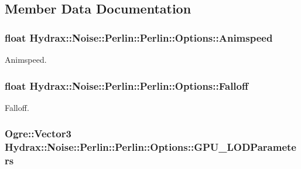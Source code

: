 \subsection{Member Data Documentation}
\hypertarget{struct_hydrax_1_1_noise_1_1_perlin_1_1_options_77f9a42f5ebbe148f0c4610f3fe818cd}{
\subsubsection[{Animspeed}]{\setlength{\rightskip}{0pt plus 5cm}float Hydrax::Noise::Perlin::Perlin::Options::Animspeed}}
\label{struct_hydrax_1_1_noise_1_1_perlin_1_1_options_77f9a42f5ebbe148f0c4610f3fe818cd}


Animspeed. 

\hypertarget{struct_hydrax_1_1_noise_1_1_perlin_1_1_options_8fdaf68802a6abfa74665e8fd31a54aa}{
\subsubsection[{Falloff}]{\setlength{\rightskip}{0pt plus 5cm}float Hydrax::Noise::Perlin::Perlin::Options::Falloff}}
\label{struct_hydrax_1_1_noise_1_1_perlin_1_1_options_8fdaf68802a6abfa74665e8fd31a54aa}


Falloff. 

\hypertarget{struct_hydrax_1_1_noise_1_1_perlin_1_1_options_8abb72bf1ee4792f2627f6bc635d7aa2}{
\subsubsection[{GPU\_\-LODParameters}]{\setlength{\rightskip}{0pt plus 5cm}Ogre::Vector3 Hydrax::Noise::Perlin::Perlin::Options::GPU\_\-LODParameters}}
\label{struct_hydrax_1_1_noise_1_1_perlin_1_1_options_8abb72bf1ee4792f2627f6bc635d7aa2}


